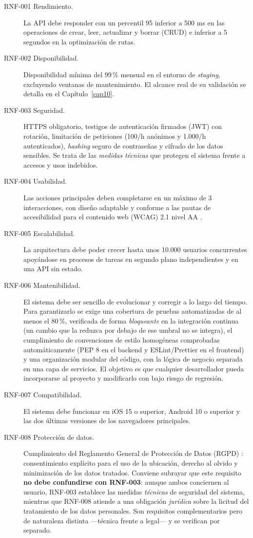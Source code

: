 \begin{description}
  \item[RNF-001 Rendimiento.] La API debe responder con un percentil 95 inferior a 500 ms en las
    operaciones de crear, leer, actualizar y borrar (CRUD) e inferior a 5 segundos en la
    optimizaci\'on de rutas.
  \item[RNF-002 Disponibilidad.] Disponibilidad m\'inima del 99\,\% mensual en el entorno de
    \emph{staging}, excluyendo ventanas de mantenimiento. El alcance real de su validaci\'on se
    detalla en el Cap\'itulo~\ref{cap10}.
  \item[RNF-003 Seguridad.] HTTPS obligatorio, testigos de autenticaci\'on firmados (JWT) con
    rotaci\'on, limitaci\'on de peticiones (100/h an\'onimos y 1.000/h autenticados), \emph{hashing}
    seguro de contrase\~nas y cifrado de los datos sensibles. Se trata de las \emph{medidas
    t\'ecnicas} que protegen el sistema frente a accesos y usos indebidos.
  \item[RNF-004 Usabilidad.] Las acciones principales deben completarse en un m\'aximo de 3
    interacciones, con dise\~no adaptable y conforme a las pautas de accesibilidad para el contenido
    web (WCAG) 2.1 nivel AA \cite{wcag21}.
  \item[RNF-005 Escalabilidad.] La arquitectura debe poder crecer hasta unos 10.000 usuarios
    concurrentes apoy\'andose en procesos de tareas en segundo plano independientes y en una API
    sin estado.
  \item[RNF-006 Mantenibilidad.] El sistema debe ser sencillo de evolucionar y corregir a lo largo
    del tiempo. Para garantizarlo se exige una cobertura de pruebas automatizadas de al menos el
    80\,\%, verificada de forma \emph{bloqueante} en la integraci\'on continua (un cambio que la
    reduzca por debajo de ese umbral no se integra), el cumplimiento de convenciones de estilo
    homog\'eneas comprobadas autom\'aticamente (PEP 8 en el backend y ESLint/Prettier en el
    frontend) y una organizaci\'on modular del c\'odigo, con la l\'ogica de negocio separada en una
    capa de servicios. El objetivo es que cualquier desarrollador pueda incorporarse al proyecto y
    modificarlo con bajo riesgo de regresi\'on.
  \item[RNF-007 Compatibilidad.] El sistema debe funcionar en iOS 15 o superior, Android 10 o
    superior y las dos \'ultimas versiones de los navegadores principales.
  \item[RNF-008 Protecci\'on de datos.] Cumplimiento del Reglamento General de Protecci\'on de
    Datos (RGPD) \cite{rgpd2016}: consentimiento expl\'icito para el uso de la ubicaci\'on, derecho
    al olvido y minimizaci\'on de los datos tratados. Conviene subrayar que este requisito
    \textbf{no debe confundirse con RNF-003}: aunque ambos conciernen al usuario, RNF-003 establece
    las medidas \emph{t\'ecnicas} de seguridad del sistema, mientras que RNF-008 atiende a una
    obligaci\'on \emph{jur\'idica} sobre la licitud del tratamiento de los datos personales. Son
    requisitos complementarios pero de naturaleza distinta ---t\'ecnica frente a legal--- y se
    verifican por separado.
\end{description}

